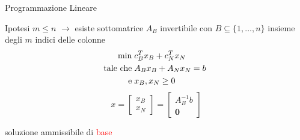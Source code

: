
\begin{frame}{\textrm{Programmazione Lineare}}

Ipotesi $m \leq n$ \pause$\longrightarrow$ esiste sottomatrice $A_{B}$ invertibile con
$B\subseteq\{1,\dots,n\}$ insieme degli $m$ indici delle colonne 
\pause
\begin{equation*}
\begin{split}
\min\;&c_{B}^{T}x_{B}+c_{N}^{T}x_{N}\\
\text{tale che\;}&A_{B}x_{B}+A_{N}x_{N}= b\;\\\text{e\;}&x_{B},x_{N}\geq0
\end{split}
\end{equation*}
\pause
\begin{equation*}
x = \left[\begin{matrix}x_{B}\\x_{N}\end{matrix}\right] = \left[\begin{matrix}A_{B}^{-1}b\\\mathbf{0}\end{matrix}\right]
\end{equation*}
\begin{center}
	soluzione ammissibile di \textcolor{red}{base}
\end{center}
\end{frame}


